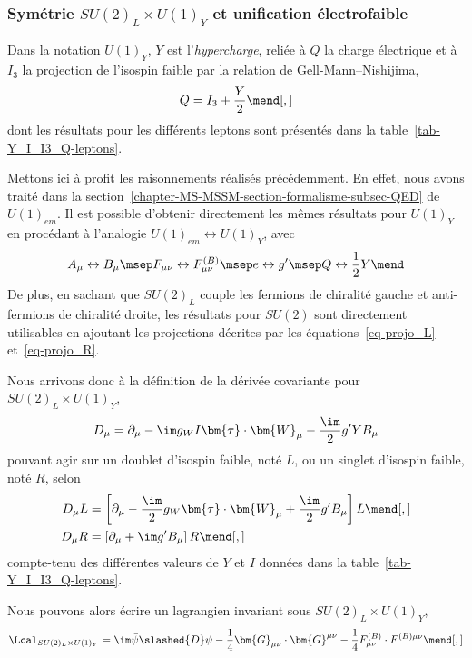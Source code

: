 \subsubsection{Symétrie $SU(2)_L \times U(1)_Y$ et unification électrofaible}\label{chapter-MS-MSSM-section-formalisme-subsec-EW-U1}
Dans la notation $U(1)_Y$, $Y$ est l'\emph{hypercharge}, reliée à $Q$ la charge électrique et à $I_3$ la projection de l'isospin faible par la relation de Gell-Mann--Nishijima,
\begin{equation}
Q = I_3 + \frac{Y}{2}
\mend[,]
\end{equation}
dont les résultats pour les différents leptons sont présentés dans la table~\ref{tab-Y_I_I3_Q-leptons}.
\par Mettons ici à profit les raisonnements réalisés précédemment. En effet, nous avons traité dans la section~\ref{chapter-MS-MSSM-section-formalisme-subsec-QED} de $U(1)_{em}$. Il est possible d'obtenir directement les mêmes résultats pour $U(1)_Y$ en procédant à l'analogie $U(1)_{em}\leftrightarrow U(1)_Y$, avec
\begin{equation}
A_\mu \leftrightarrow B_\mu
\msep
F_{\mu\nu} \leftrightarrow F^{(B)}_{\mu\nu}
\msep
e \leftrightarrow g'
\msep
Q \leftrightarrow \frac{1}{2}Y
\mend
\end{equation}
De plus, en sachant que $SU(2)_L$ couple les fermions de chiralité gauche et anti-fermions de chiralité droite, les résultats pour $SU(2)$ sont directement utilisables en ajoutant les projections décrites par les équations~\eqref{eq-projo_L} et~\eqref{eq-projo_R}.
\par Nous arrivons donc à la définition de la dérivée covariante pour $SU(2)_L \times U(1)_Y$,
\begin{equation}
D_\mu = \partial_\mu - \im g_WI \bm{\tau}\cdot\bm{W}_\mu - \frac{\im}{2}g'YB_\mu
\end{equation}
pouvant agir sur un doublet d'isospin faible, noté $L$, ou un singlet d'isospin faible, noté $R$, selon
\begin{align}
D_\mu L &= \left[ \partial_\mu - \frac{\im}{2}g_W \bm{\tau}\cdot\bm{W}_\mu + \frac{\im}{2}g'B_\mu \right] L
\mend[,]
\\
D_\mu R &= \left[ \partial_\mu + \im g'B_\mu \right] R
\mend[,]
\end{align}
compte-tenu des différentes valeurs de $Y$ et $I$ données dans la table~\ref{tab-Y_I_I3_Q-leptons}.
\par Nous pouvons alors écrire un lagrangien invariant sous $SU(2)_L\times U(1)_Y$,
\begin{equation}
\Lcal_{SU(2)_L\times U(1)_Y}
=
\im \bar{\psi} \slashed{D} \psi - \frac{1}{4} \bm{G}_{\mu\nu} \cdot \bm{G}^{\mu\nu} - \frac{1}{4} F^{(B)}_{\mu\nu} \cdot F^{(B)\mu\nu}
\mend[,]
\label{eq-chapter-MS-MSSM-section-formalisme-subsec-EW-LSU2LU1Y}
\end{equation}
